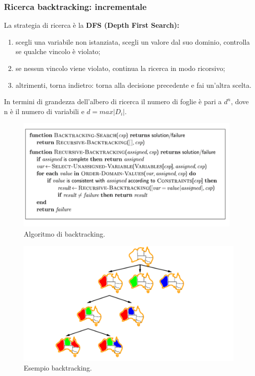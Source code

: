 \subsubsection{Ricerca backtracking: incrementale}
La strategia di ricerca è la \textbf{DFS (Depth First Search):}
\begin{enumerate}
    \item scegli una variabile non istanziata, scegli un valore dal suo dominio,
          controlla se qualche vincolo è violato;
    \item se nessun vincolo viene violato, continua la ricerca in modo
          ricorsivo;
    \item altrimenti, torna indietro: torna alla decisione precedente e fai
          un'altra scelta.
\end{enumerate}
In termini di grandezza dell'albero di ricerca il numero di foglie è pari a
$d^n$, dove n è il numero di variabili e $d = max|D_i|$.

\begin{figure}[H]
    \centering
    \includegraphics[width=11cm, keepaspectratio]{img/Cap2/dfs.png}
    \caption{Algoritmo di backtracking.}
\end{figure}
\begin{figure}[H]
    \centering
    \includegraphics[width=12cm, keepaspectratio]{img/Cap2/dfs2.png}
    \caption{Esempio backtracking.}
\end{figure}

